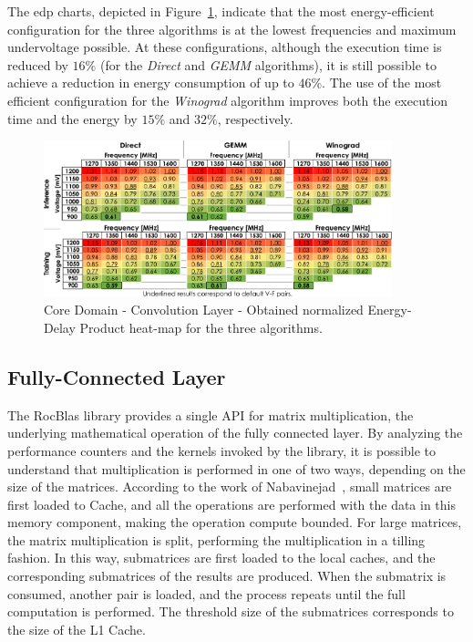 The \acrshort{edp} charts, depicted in Figure~\ref{fig:Convolution_EDP}, indicate that the most energy-efficient configuration for the three algorithms is at the lowest frequencies and maximum undervoltage possible. At these configurations, although the execution time is reduced by $16\%$ (for the \textit{Direct} and \textit{GEMM} algorithms), it is still possible to achieve a reduction in energy consumption of up to $46\%$. The use of the most efficient configuration for the \textit{Winograd} algorithm improves both the execution time and the energy by $15\%$ and $32\%$, respectively.

\begin{figure}[htbp]
    \centering
        \includegraphics[width=0.9\textwidth]{Figures/Application To Deep Learning/Convolution_EDP.pdf}
        \caption{Core Domain - Convolution Layer - Obtained normalized Energy-Delay Product heat-map for the three algorithms.}
    \label{fig:Convolution_EDP}
\end{figure}



\subsection{Fully-Connected Layer}


The RocBlas library provides a single API for matrix multiplication, the underlying mathematical operation of the fully connected layer. By analyzing the performance counters and the kernels invoked by the library, it is possible to understand that multiplication is performed in one of two ways, depending on the size of the matrices.
According to the work of Nabavinejad~\cite{dutot_high-performance_2016}, small matrices are first loaded to Cache, and all the operations are performed with the data in this memory component, making the operation compute bounded. For large matrices, the matrix multiplication is split, performing the multiplication in a tilling fashion. In this way, submatrices are first loaded to the local caches, and the corresponding submatrices of the results are produced. When the submatrix is consumed, another pair is loaded, and the process repeats until the full computation is performed. The threshold size of the submatrices corresponds to the size of the L1 Cache. 


